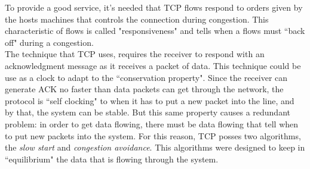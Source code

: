 To provide a good service, it's needed that TCP flows respond to orders given by
the hosts machines that controls the connection during congestion. This
characteristic of flows is called "responsiveness" and tells when a flows must
``back off" during a congestion.\\

The technique that TCP uses, requires the receiver to respond with an
acknowledgment message as it receives a packet of data. This technique could be
use as a clock to adapt to the ``conservation property". Since the receiver can
generate ACK no faster than data packets can get through the network, the
protocol is ``self clocking" to when it has to put a new packet into the line,
and by that, the system can be stable. But this same property causes a redundant
problem: in order to get data flowing, there must be data flowing that tell when
to put new packets into the system. For this reason, TCP posses two algorithms,
the \textit{slow start} and \textit{congestion avoidance}. This algorithms were
designed to keep in ``equilibrium" the data that is flowing through the
system.\\

